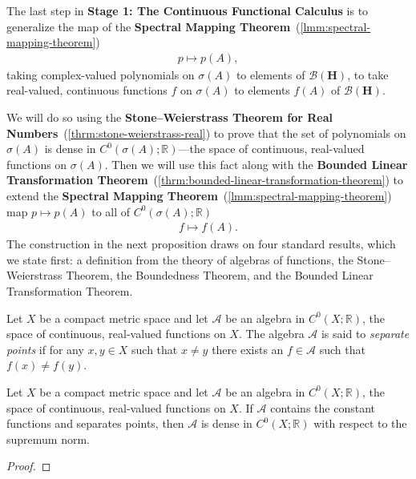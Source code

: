 The last step in \textbf{Stage 1: The Continuous Functional Calculus} is to generalize the map of the \textbf{Spectral Mapping Theorem}~(\ref{lmm:spectral-mapping-theorem})
\begin{align}
    p \longmapsto p(A),
\end{align}
taking complex-valued polynomials on $\sigma(A)$ to elements of $\mathcal{B}(\mathbf{H})$, to take real-valued, continuous functions $f$ on $\sigma(A)$ to elements $f(A)$ of $\mathcal{B}(\mathbf{H})$.

We will do so using the \textbf{Stone–Weierstrass Theorem for Real Numbers}~(\ref{thrm:stone-weierstrass-real}) to prove that the set of polynomials on $\sigma(A)$ is dense in $C^0(\sigma(A); \mathbb{R})$---the space of continuous, real-valued functions on $\sigma(A)$. Then we will use this fact along with the \textbf{Bounded Linear Transformation Theorem}~(\ref{thrm:bounded-linear-transformation-theorem}) to extend the \textbf{Spectral Mapping Theorem}~(\ref{lmm:spectral-mapping-theorem}) map $ p \mapsto p(A)$ to all of $C^0(\sigma(A); \mathbb{R})$
\begin{align}
    f \longmapsto f(A).
\end{align}
The construction in the next proposition draws on four standard results, which we state first: a definition from the theory of algebras of functions, the Stone–Weierstrass Theorem, the Boundedness Theorem, and the Bounded Linear Transformation Theorem.

\begin{definition}
    \label{def:separates-points}
    \leanok
    Let $X$ be a compact metric space and let $\mathcal{A}$ be an algebra in $C^0(X; \mathbb{R})$, the space of continuous, real-valued functions on $X$. The algebra $\mathcal{A}$ is said to \textit{separate points} if for any $x,y \in X$ such that $x \neq y$ there exists an $f \in \mathcal{A}$ such that $f(x) \neq f(y)$.
\end{definition}

\begin{theorem}
    \label{thrm:stone-weierstrass-real}
    \leanok
    Let $X$ be a compact metric space and let $\mathcal{A}$ be an algebra in $C^0(X; \mathbb{R})$, the space of continuous, real-valued functions on $X$. If $\mathcal{A}$ contains the constant functions and separates points, then $\mathcal{A}$ is dense in $C^0(X; \mathbb{R})$ with respect to the supremum norm.
\end{theorem}
\begin{proof}
\leanok
\end{proof}

